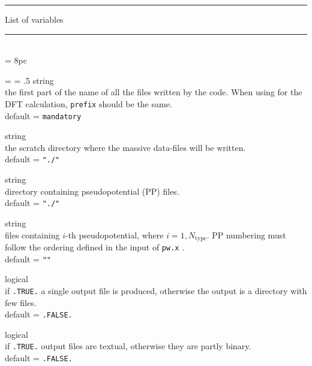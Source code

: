 %
%
\begin{centering}
\rule{2.5in}{0.01in} List of variables \rule{2.5in}{0.01in}
\end{centering}\\

\newdimen\descindent \descindent = 8pc
{\noindent \leftskip = \descindent \parskip = .5\baselineskip
{}%
{\sc string} \\ the first part of the name of all the files written by
the code. When using \PWSCF for the DFT calculation, {\tt prefix} should be the
same.\\ {\sc default} = {\tt mandatory} \par

\noindent{}%
{\sc string} \\ the scratch directory where the massive data-files will
be written.\\  {\sc default} = {\tt "./" }\par

\noindent{}%
{\sc string} \\directory containing pseudopotential (PP) files.\\
{\sc default} = {\tt "./"} \par

\noindent{}%
{\sc string} \\ files containing $i$-th pseudopotential, where $i=1, N_{\text{type}}$. 
PP numbering must follow the ordering defined in the input of {\tt pw.x} . \\
{\sc default} =  {\tt ""} \par
\par

\noindent{}%
{\sc logical} \\ if {\tt .TRUE.} a single output file is produced, otherwise
  the output is a directory with few files.\\ 
{\sc default} = {\tt .FALSE. }\par

\noindent{}%
{\sc logical}  \\ if {\tt .TRUE.} output files are textual, otherwise
they are partly binary.\\ 
{\sc default} = {\tt .FALSE.} \par}\bigskip


